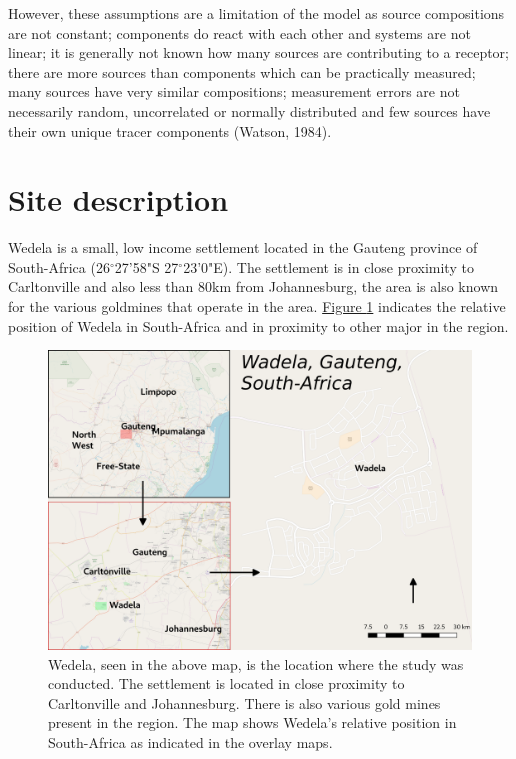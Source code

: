 \documentclass{nwureport}
\begin{document}
However, these assumptions are a limitation of the model as source compositions are not constant;
components do react with each other and systems are not linear; it is generally not known how many
sources are contributing to a receptor; there are more sources than components which can be practically
measured; many sources have very similar compositions; measurement errors are not necessarily random,
uncorrelated or normally distributed and few sources have their own unique tracer components (Watson,
1984).

\section{Site description}
Wedela is a small, low income settlement located in the Gauteng province of
South-Africa (26$^\circ$27'58"S 27$^\circ$23'0"E). The settlement is in close proximity to Carltonville
and also less than 80km from Johannesburg, the area is also known for the various goldmines
that operate in the area. \hyperref[fig:wadela]{Figure \ref{fig:wadela}}
indicates the relative position of Wedela in South-Africa and in proximity to other major
in the region.

\begin{figure}[!htb]
    \centering
    \includegraphics[width=\textwidth]{images/study_area_qgis.png}
    \caption[Study area: Wedela, Gauteng]{Wedela, seen in the above map, is the location where
    the study was conducted. The settlement is located in close proximity to Carltonville and Johannesburg.
    There is also various gold mines present in the region. The map shows Wedela's relative position in
    South-Africa as indicated in the overlay maps.}
    \label{fig:wadela}
\end{figure}
\end{document}
